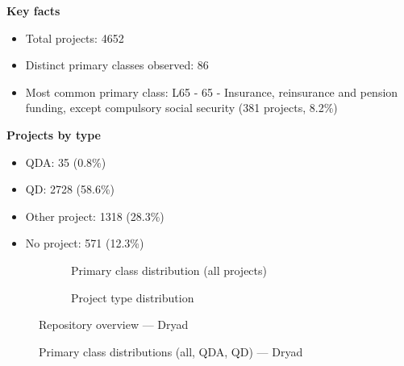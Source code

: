 \textbf{Key facts}

\begin{itemize}
    \item Total projects: 4652
    \item Distinct primary classes observed: 86
    \item Most common primary class: L65 - 65 - Insurance, reinsurance and pension funding, except compulsory social security (381 projects, 8.2\%)
\end{itemize}

\textbf{Projects by type}

\begin{itemize}
    \item QDA: 35 (0.8\%)
    \item QD: 2728 (58.6\%)
    \item Other project: 1318 (28.3\%)
    \item No project: 571 (12.3\%)
\end{itemize}

\begin{figure}[H]
    \centering
    \begin{subfigure}[t]{0.49\textwidth}
        \centering
        
        \caption{Primary class distribution (all projects)}
    \end{subfigure}
    \hfill
    \begin{subfigure}[t]{0.49\textwidth}
        \centering
        
        \caption{Project type distribution}
    \end{subfigure}
    \caption{Repository overview --- Dryad}
\end{figure}

\clearpage

\begin{figure}[H]
    \centering
    
    \par\vspace{0.8em}
    
    \par\vspace{0.8em}
    
    \caption{Primary class distributions (all, QDA, QD) --- Dryad}
\end{figure}

